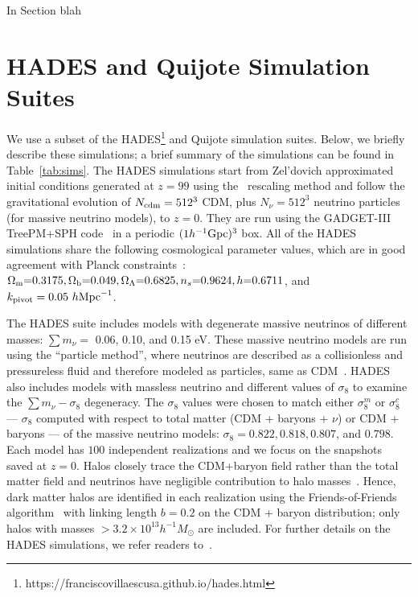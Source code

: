 \documentclass[12pt, letterpaper, preprint]{aastex62}
\newcommand{\Om}{\Omega_{\rm m}}
\newcommand{\Ob}{\Omega_{\rm b}}
\newcommand{\OL}{\Omega_\Lambda}
\newcommand{\smnu}{\sum m_\nu}
\begin{document}
In Section blah 


\section{HADES and Quijote Simulation Suites} \label{sec:hades} 
We use a subset of the HADES\footnote{https://franciscovillaescusa.github.io/hades.html} 
and Quijote simulation suites. Below, we briefly describe these simulations; 
a brief summary of the simulations can be found in Table~\ref{tab:sims}. 
The HADES simulations start from Zel'dovich approximated initial conditions 
generated at $z=99$ using the~\cite{zennaro2017a} rescaling method and follow 
the gravitational evolution of $N_{\rm cdm}=512^3$ CDM, plus $N_{\nu}=512^3$ 
neutrino particles (for massive neutrino models), to $z=0$. They are run using 
the {\sc GADGET-III} TreePM+SPH code~\citep{springel2005} in a periodic 
$(1 h^{-1}{\rm Gpc})^3$ box. All of the HADES simulations share the following 
cosmological parameter values, which are in good agreement with Planck 
constraints~\cite{ade2016a}: $\Om{=}0.3175, \Ob{=}0.049, \OL{=}0.6825, n_s{=}0.9624, h{=}0.6711$, 
and $k_{\rm pivot} = 0.05~h{\rm Mpc}^{-1}$. 

The HADES suite includes models with degenerate massive neutrinos of different 
masses: $\smnu = $ 0.06, 0.10, and 0.15 eV. These massive neutrino models are run 
using the ``particle method'', where neutrinos are described as a collisionless 
and pressureless fluid and therefore modeled as particles, same as 
CDM~\citep{brandbyge2008,viel2010}. HADES also includes models with massless 
neutrino and different values of $\sigma_8$ to examine the $\smnu-\sigma_8$ 
degeneracy. The $\sigma_8$ values were chosen to match either $\sigma_8^m$ or 
$\sigma_8^{c}$ --- $\sigma_8$ computed with respect to total matter 
(CDM + baryons + $\nu$) or CDM + baryons --- of the massive neutrino models: 
$\sigma_8 = 0.822, 0.818, 0.807$, and $0.798$. Each model has $100$ independent 
realizations and we focus on the snapshots saved at $z = 0$. Halos closely 
trace the CDM+baryon field rather than the total matter field and neutrinos 
have negligible contribution to halo masses~\citep[\emph{e.g.}][]{ichiki2012, castorina2014, loverde2014, villaescusa-navarro2014}.
Hence, dark matter halos are identified in each realization using the Friends-of-Friends 
algorithm~\cite[FoF;][]{davis1985} with linking length $b=0.2$ on the CDM + baryon
distribution; only halos with masses $> 3.2\times 10^{13} h^{-1}M_\odot$ 
are included. For further details on the HADES simulations, we refer readers 
to~\cite{villaescusa-navarro2018}. 
\end{document}
